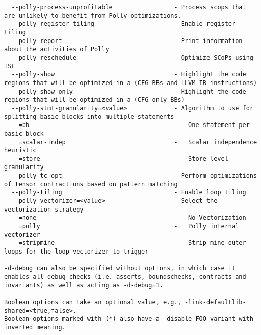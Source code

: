 \documentclass{studrep}
\begin{document}
\begin{verbatim}
  --polly-process-unprofitable                 - Process scops that are unlikely to benefit from Polly optimizations.
  --polly-register-tiling                      - Enable register tiling
  --polly-report                               - Print information about the activities of Polly
  --polly-reschedule                           - Optimize SCoPs using ISL
  --polly-show                                 - Highlight the code regions that will be optimized in a (CFG BBs and LLVM-IR instructions)
  --polly-show-only                            - Highlight the code regions that will be optimized in a (CFG only BBs)
  --polly-stmt-granularity=<value>             - Algorithm to use for splitting basic blocks into multiple statements
    =bb                                        -   One statement per basic block
    =scalar-indep                              -   Scalar independence heuristic
    =store                                     -   Store-level granularity
  --polly-tc-opt                               - Perform optimizations of tensor contractions based on pattern matching
  --polly-tiling                               - Enable loop tiling
  --polly-vectorizer=<value>                   - Select the vectorization strategy
    =none                                      -   No Vectorization
    =polly                                     -   Polly internal vectorizer
    =stripmine                                 -   Strip-mine outer loops for the loop-vectorizer to trigger

-d-debug can also be specified without options, in which case it enables all debug checks (i.e. asserts, boundschecks, contracts and invariants) as well as acting as -d-debug=1.

Boolean options can take an optional value, e.g., -link-defaultlib-shared=<true,false>.
Boolean options marked with (*) also have a -disable-FOO variant with inverted meaning.
\end{verbatim}
\end{document}
